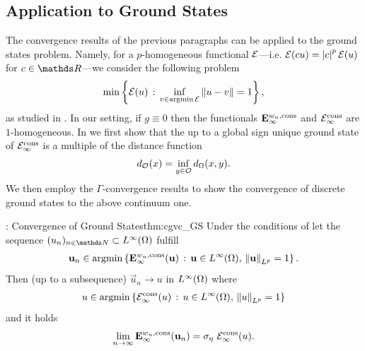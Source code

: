 \subsection{Application to Ground States}
%
The convergence results of the previous paragraphs can be applied to the ground states problem. Namely, for a $p$-homogeneous functional $\mathcal{E}$---i.e. $\mathcal{E}{}(cu) = \left|c\right|^p \mathcal{E}{}(u)$ for $c\in\R$---we consider the following problem
%
\begin{align*}
\min\left\lbrace \mathcal{E}(u) \,:\, \inf_{v\in\operatorname{argmin} \mathcal{E}{}}\left\|u-v\right\| = 1 \right\rbrace,
\end{align*}
%
as studied in \cite{bung20}. In our setting, if $g\equiv 0$ then the functionals $\mathbf{E}^{w_n,\text{cons}}_\infty$ and $\mathcal{E}^{\text{cons}}_\infty$ are $1$-homogeneous. In \cite[Th. 5]{roith2022continuum} we first show that the up to a global sign unique ground state of $\mathcal{E}^{\text{cons}}_\infty$ is a multiple of the distance function
%
\begin{align*}
d_{\mathcal{O}}(x)=
\inf_{y\in\mathcal{O}}d_\Omega(x,y).
\end{align*}
%
%
We then employ the $\Gamma$-convergence results to show the convergence of discrete ground states to the above continuum one.
%
\begin{theorem}{\cite[Thm. 6]{roith2022continuum}: Convergence of Ground States}{thm:cgvc_GS}
Under the conditions of \cite[Thm. 1]{roith2022continuum} let the sequence $(u_n)_{n\in\N}\subset L^{\infty}(\domain)$ fulfill
\begin{align*}
    \mathbf{u}_n \in \operatorname{argmin}\left\lbrace
    \mathbf{E}^{w_n,\mathrm{cons}}_\infty(\mathbf{u}) \,:\,\mathbf{u}\in L^{\infty}(\Omega),\, \left\|\mathbf{u}\right\|_{L^{p}}=1 \right\rbrace.
\end{align*}
Then (up to a subsequence) $\vec u_n\to u$ in $L^{\infty}(\Omega)$ where
\begin{align*}
    u \in \operatorname{argmin}\left\lbrace
    \mathcal{E}^{\mathrm{cons}}_\infty(u) \,:\,u\in L^{\infty}(\Omega),\, \left\|u\right\|_{L^{p}}=1 \right\rbrace
\end{align*}
and it holds
\begin{align}\label{eq:cvgc_eigenvalues}
    \lim_{n\to\infty}{\mathbf{E}^{w_n,\mathrm{cons}}_\infty(\mathbf{u}_n)} = \sigma_\eta~\mathcal{E}^{\mathrm{cons}}_\infty(u).
\end{align}
\end{theorem}


%
